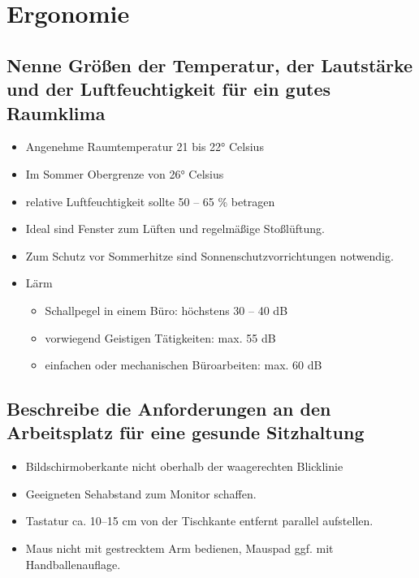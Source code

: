 \documentclass[a4paper]{article}
\begin{document}
    \section{Ergonomie}\label{sec:ergonomie}

    \subsection{\color{red}Nenne Größen der Temperatur, der Lautstärke und der Luftfeuchtigkeit für ein gutes Raumklima}\label{subsec:color{red}nenne-größen-der-temperatur-der-lautstärke-und-der-luftfeuchtigkeit-für-ein-gutes-raumklima}
    \begin{itemize}
        \color{magenta}
        \item Angenehme Raumtemperatur 21 bis 22° Celsius
        \item Im Sommer Obergrenze von 26° Celsius
        \item relative Luftfeuchtigkeit sollte 50 – 65 \% betragen
        \item Ideal sind Fenster zum Lüften und regelmäßige Stoßlüftung.
        \item Zum Schutz vor Sommerhitze sind Sonnenschutzvorrichtungen notwendig.
        \item \color[HTML]{F56B00} Lärm
        \begin{itemize}
            \item Schallpegel in einem Büro: höchstens 30 – 40 dB
            \item vorwiegend Geistigen Tätigkeiten: max.
            55 dB
            \item einfachen oder mechanischen Büroarbeiten: max.
            60 dB
        \end{itemize}
    \end{itemize}

    \subsection{\color{red}Beschreibe die Anforderungen an den Arbeitsplatz für eine gesunde Sitzhaltung}\label{subsec:color{red}beschreibe-die-anforderungen-an-den-arbeitsplatz-für-eine-gesunde-sitzhaltung}
    \begin{itemize}
        \color{magenta}
        \item Bildschirmoberkante nicht oberhalb
        der waagerechten Blicklinie
        \item Geeigneten Sehabstand zum
        Monitor schaffen.
        \item Tastatur ca.
        10--15 cm von
        der Tischkante entfernt parallel
        aufstellen.
        \item Maus nicht mit gestrecktem Arm bedienen, Mauspad ggf.
        mit Handballenauflage.
    \end{itemize}
\end{document}
